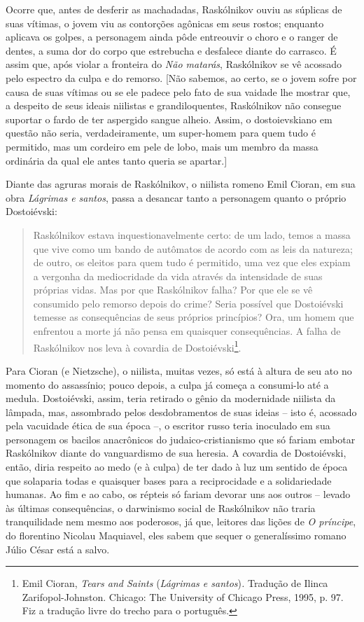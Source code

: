 Ocorre que, antes de desferir as machadadas, Raskólnikov ouviu as
súplicas de suas vítimas, o jovem viu as contorções agônicas em seus
rostos; enquanto aplicava os golpes, a personagem ainda pôde entreouvir
o choro e o ranger de dentes, a suma dor do corpo que estrebucha e
desfalece diante do carrasco. É assim que, após violar a fronteira do
\emph{Não matarás}, Raskólnikov se vê acossado pelo espectro da culpa e
do remorso. {[}Não sabemos, ao certo, se o jovem sofre por causa de suas
vítimas ou se ele padece pelo fato de sua vaidade lhe mostrar que, a
despeito de seus ideais niilistas e grandiloquentes, Raskólnikov não
consegue suportar o fardo de ter aspergido sangue alheio. Assim, o
dostoievskiano em questão não seria, verdadeiramente, um super-homem
para quem tudo é permitido, mas um cordeiro em pele de lobo, mais um
membro da massa ordinária da qual ele antes tanto queria se apartar.{]}

Diante das agruras morais de Raskólnikov, o niilista romeno Emil Cioran,
em sua obra \emph{Lágrimas e santos}, passa a desancar tanto a
personagem quanto o próprio Dostoiévski:

\begin{quote}
Raskólnikov estava inquestionavelmente certo: de um lado, temos a massa
que vive como um bando de autômatos de acordo com as leis da natureza;
de outro, os eleitos para quem tudo é permitido, uma vez que eles expiam
a vergonha da mediocridade da vida através da intensidade de suas
próprias vidas. Mas por que Raskólnikov falha? Por que ele se vê
consumido pelo remorso depois do crime? Seria possível que Dostoiévski
temesse as consequências de seus próprios princípios? Ora, um homem que
enfrentou a morte já não pensa em quaisquer consequências. A falha de
Raskólnikov nos leva à covardia de Dostoiévski\footnote{Emil Cioran,
  \emph{Tears and Saints} (\emph{Lágrimas e santos})\emph{.} Tradução de
  Ilinca Zarifopol-Johnston. Chicago: The University of Chicago Press,
  1995, p. 97. Fiz a tradução livre do trecho para o português.}.
\end{quote}

Para Cioran (e Nietzsche), o niilista, muitas vezes, só está à altura de
seu ato no momento do assassínio; pouco depois, a culpa já começa a
consumi-lo até a medula. Dostoiévski, assim, teria retirado o gênio da
modernidade niilista da lâmpada, mas, assombrado pelos desdobramentos de
suas ideias -- isto é, acossado pela vacuidade ética de sua época --, o
escritor russo teria inoculado em sua personagem os bacilos anacrônicos
do judaico-cristianismo que só fariam embotar Raskólnikov diante do
vanguardismo de sua heresia. A covardia de Dostoiévski, então, diria
respeito ao medo (e à culpa) de ter dado à luz um sentido de época que
solaparia todas e quaisquer bases para a reciprocidade e a solidariedade
humanas. Ao fim e ao cabo, os répteis só fariam devorar uns aos outros
-- levado às últimas consequências, o darwinismo social de Raskólnikov
não traria tranquilidade nem mesmo aos poderosos, já que, leitores das
lições de \emph{O príncipe}, do florentino Nicolau Maquiavel, eles sabem
que sequer o generalíssimo romano Júlio César está a salvo.

